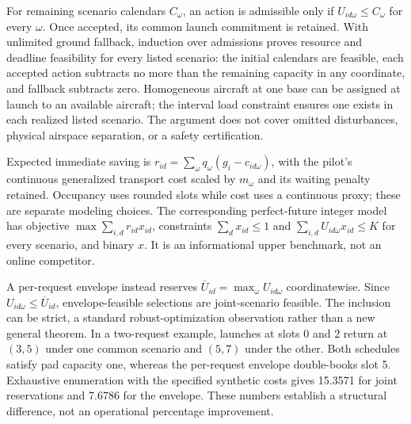 \documentclass[11pt,a4paper]{article}
\begin{document}
For remaining scenario calendars $C_\omega$, an action is admissible only if $U_{id\omega}\leq C_\omega$ for every $\omega$. Once accepted, its common launch commitment is retained. With unlimited ground fallback, induction over admissions proves resource and deadline feasibility for every listed scenario: the initial calendars are feasible, each accepted action subtracts no more than the remaining capacity in any coordinate, and fallback subtracts zero. Homogeneous aircraft at one base can be assigned at launch to an available aircraft; the interval load constraint ensures one exists in each realized listed scenario. The argument does not cover omitted disturbances, physical airspace separation, or a safety certification.

Expected immediate saving is $r_{id}=\sum_\omega q_\omega(g_i-c_{id\omega})$, with the pilot's continuous generalized transport cost scaled by $m_\omega$ and its waiting penalty retained. Occupancy uses rounded slots while cost uses a continuous proxy; these are separate modeling choices. The corresponding perfect-future integer model has objective $\max\sum_{i,d}r_{id}x_{id}$, constraints $\sum_d x_{id}\leq1$ and $\sum_{i,d}U_{id\omega}x_{id}\leq K$ for every scenario, and binary $x$. It is an informational upper benchmark, not an online competitor.

A per-request envelope instead reserves $\overline U_{id}=\max_\omega U_{id\omega}$ coordinatewise. Since $U_{id\omega}\leq\overline U_{id}$, envelope-feasible selections are joint-scenario feasible. The inclusion can be strict, a standard robust-optimization observation rather than a new general theorem. In a two-request example, launches at slots 0 and 2 return at $(3,5)$ under one common scenario and $(5,7)$ under the other. Both schedules satisfy pad capacity one, whereas the per-request envelope double-books slot 5. Exhaustive enumeration with the specified synthetic costs gives 15.3571 for joint reservations and 7.6786 for the envelope. These numbers establish a structural difference, not an operational percentage improvement.
\end{document}
